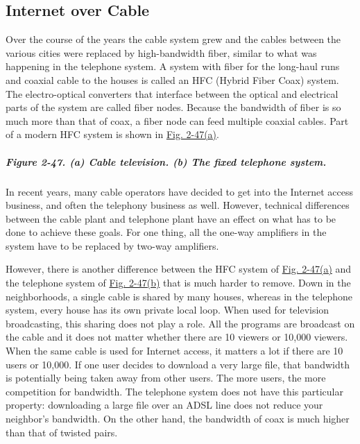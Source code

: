 \subsection{Internet over Cable}

Over the course of the years the cable system grew and the cables
between the various cities were replaced by high-bandwidth fiber,
similar to what was happening in the telephone system. A system with
fiber for the long-haul runs and coaxial cable to the houses is called
an {HFC} ({Hybrid Fiber Coax}) system. The electro-optical converters
that interface between the optical and electrical parts of the system
are called {fiber nodes}. Because the bandwidth of fiber is so much more
than that of coax, a fiber node can feed multiple coaxial cables. Part
of a modern HFC system is shown in
\protect\hyperlink{0130661023_ch02lev1sec7.htmlux5cux23ch02fig47}{Fig.
2-47(a)}.

\subparagraph[Figure 2-47. (a) Cable television. (b) The fixed telephone
system.]{\texorpdfstring{\protect\hypertarget{0130661023_ch02lev1sec7.htmlux5cux23ch02fig47}{}{}Figure
2-47. (a) Cable television. (b) The fixed telephone
system.}{Figure 2-47. (a) Cable television. (b) The fixed telephone system.}}


In recent years, many cable operators have decided to get into the
Internet access business, and often the telephony business as well.
However, technical differences between the cable plant and telephone
plant have an effect on what has to be done to achieve these goals. For
one thing, all the one-way amplifiers in the system have to be replaced
by two-way amplifiers.

However, there is another difference between the HFC system of
\protect\hyperlink{0130661023_ch02lev1sec7.htmlux5cux23ch02fig47}{Fig.
2-47(a)} and the telephone system of
\protect\hyperlink{0130661023_ch02lev1sec7.htmlux5cux23ch02fig47}{Fig.
2-47(b)} that is much harder to remove. Down in the neighborhoods, a
single cable is shared by many houses, whereas in the telephone system,
every house has its own private local loop. When used for television
broadcasting, this sharing does not play a role. All the programs are
broadcast on the cable and it does not matter whether there are 10
viewers or 10,000 viewers. When the same cable is used for Internet
access, it matters a lot if there are 10 users or 10,000. If one user
decides to download a very large file, that bandwidth is potentially
being taken away from other users. The more users, the more competition
for bandwidth. The telephone system does not have this particular
property: downloading a large file over an ADSL line does not reduce
your neighbor's bandwidth. On the other hand, the bandwidth of coax is
much higher than that of twisted pairs.

